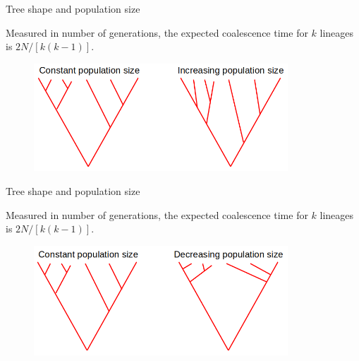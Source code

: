 \begin{frame}{Tree shape and population size}

	\small
	Measured in number of generations, the expected coalescence time for $k$ lineages is $2N/[k(k-1)]$.

	\begin{figure}
         	\includegraphics[width=0.85\textwidth]{Pics/tree_N_i}
        \end{figure}

\end{frame}


\begin{frame}{Tree shape and population size}

        \small
        Measured in number of generations, the expected coalescence time for $k$ lineages is $2N/[k(k-1)]$.

        \begin{figure}
                \includegraphics[width=0.85\textwidth]{Pics/tree_N_d}
        \end{figure}

\end{frame}


